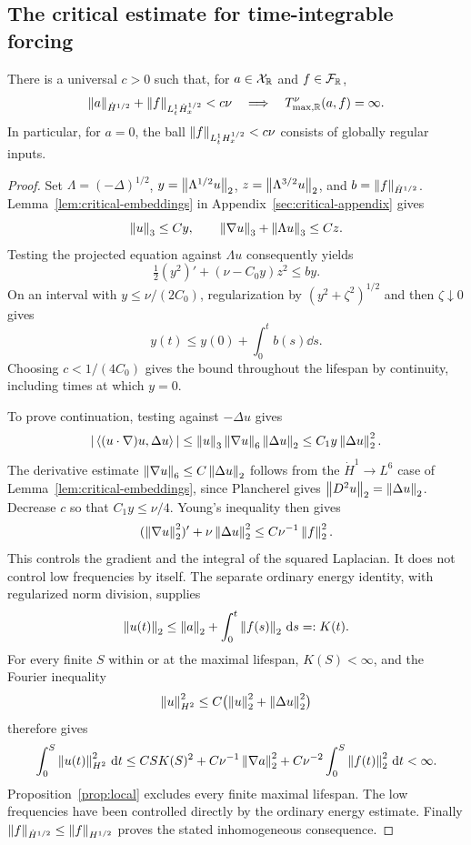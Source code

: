 \subsection{The critical estimate for time-integrable forcing}
\begin{proposition}\label{prop:Rcritical1}
There is a universal $c>0$ such that, for $a\in\mathcal X_{\mathbb R}$ and $f\in\mathcal F_{\mathbb R}$,
\[
 \left\lVert a\right\rVert_{\dot H^{1/2}}+\left\lVert f\right\rVert_{L^1_t\dot H^{1/2}_x}<c\nu
 \quad\Longrightarrow\quad T^\nu_{\max,\mathbb R}(a,f)=\infty.
\]
In particular, for $a=0$, the ball $\left\lVert f\right\rVert_{L^1_tH^{1/2}_x}<c\nu$ consists of globally regular inputs.
\end{proposition}
\begin{proof}
Set $\Lambda=(-\Delta)^{1/2}$, $y=\left\lVert\Lambda^{1/2}u\right\rVert_2$, $z=\left\lVert\Lambda^{3/2}u\right\rVert_2$, and $b=\left\lVert f\right\rVert_{\dot H^{1/2}}$. Lemma~\ref{lem:critical-embeddings} in Appendix~\ref{sec:critical-appendix} gives
\[
 \left\lVert u\right\rVert_3\le Cy,\qquad
 \left\lVert\nabla u\right\rVert_3+\left\lVert\Lambda u\right\rVert_3\le Cz.
\]
Testing the projected equation against $\Lambda u$ consequently yields
\begin{equation}\label{eq:Rcritical1}
 \tfrac12(y^2)'+(\nu-C_0y)z^2\le by.
\end{equation}
On an interval with $y\le\nu/(2C_0)$, regularization by $(y^2+\zeta^2)^{1/2}$ and then $\zeta\downarrow0$ gives
\[
 y(t)\le y(0)+\int_0^tb(s)\dd s.
\]
Choosing $c<1/(4C_0)$ gives the bound throughout the lifespan by continuity, including times at which $y=0$.

To prove continuation, testing against $-\Delta u$ gives
\[
 |\left\langle(u\cdot\nabla)u,\Delta u\right\rangle|
 \le\left\lVert u\right\rVert_3\left\lVert\nabla u\right\rVert_6\left\lVert\Delta u\right\rVert_2
 \le C_1y\left\lVert\Delta u\right\rVert_2^2.
\]
The derivative estimate $\left\lVert\nabla u\right\rVert_6\le C\left\lVert\Delta u\right\rVert_2$ follows from the $\dot H^1\to L^6$ case of Lemma~\ref{lem:critical-embeddings}, since Plancherel gives $\left\lVert D^2u\right\rVert_2=\left\lVert\Delta u\right\rVert_2$. Decrease $c$ so that $C_1y\le\nu/4$. Young's inequality then gives
\begin{equation}\label{eq:RH1}
 (\left\lVert\nabla u\right\rVert_2^2)'+\nu\left\lVert\Delta u\right\rVert_2^2
 \le C\nu^{-1}\left\lVert f\right\rVert_2^2.
\end{equation}
This controls the gradient and the integral of the squared Laplacian. It does not control low frequencies by itself. The separate ordinary energy identity, with regularized norm division, supplies
\begin{equation}\label{eq:RL2}
 \left\lVert u(t)\right\rVert_2\le\left\lVert a\right\rVert_2+\int_0^t\left\lVert f(s)\right\rVert_2\,\mathrm d s=:K(t).
\end{equation}
For every finite $S$ within or at the maximal lifespan, $K(S)<\infty$, and the Fourier inequality
\[
 \left\lVert u\right\rVert_{H^2}^2\le C\bigl(\left\lVert u\right\rVert_2^2+\left\lVert\Delta u\right\rVert_2^2\bigr)
\]
therefore gives
\[
 \int_0^S\left\lVert u(t)\right\rVert_{H^2}^2\,\mathrm d t
 \le C S K(S)^2
  +C\nu^{-1}\left\lVert\nabla a\right\rVert_2^2
  +C\nu^{-2}\int_0^S\left\lVert f(t)\right\rVert_2^2\,\mathrm d t<\infty.
\]
Proposition~\ref{prop:local} excludes every finite maximal lifespan. The low frequencies have been controlled directly by the ordinary energy estimate. Finally $\left\lVert f\right\rVert_{\dot H^{1/2}}\le\left\lVert f\right\rVert_{H^{1/2}}$ proves the stated inhomogeneous consequence.
\end{proof}


